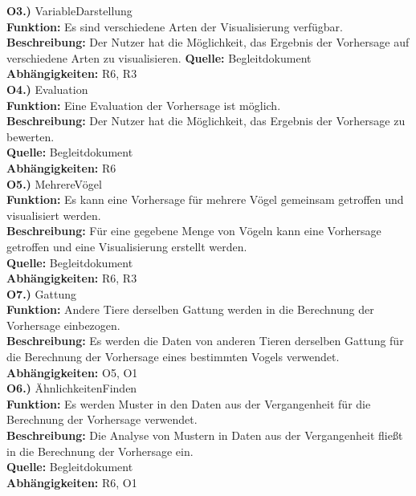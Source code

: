 \documentclass[12pt]{article} %
\begin{document}
\textbf{O3.)} VariableDarstellung \\
\textbf{Funktion:} Es sind verschiedene Arten der Visualisierung verfügbar.
\textbf{Beschreibung:} Der Nutzer hat die Möglichkeit, das Ergebnis der Vorhersage auf verschiedene Arten zu visualisieren.
\textbf{Quelle:} Begleitdokument \\
\textbf{Abhängigkeiten:} R6, R3 \\

\textbf{O4.)} Evaluation \\
\textbf{Funktion:} Eine Evaluation der Vorhersage ist möglich. \\
\textbf{Beschreibung:} Der Nutzer hat die Möglichkeit, das Ergebnis der Vorhersage zu bewerten. \\
\textbf{Quelle:} Begleitdokument \\
\textbf{Abhängigkeiten:} R6 \\

\textbf{O5.)} MehrereVögel \\
\textbf{Funktion:} Es kann eine Vorhersage für mehrere Vögel gemeinsam getroffen und visualisiert werden. \\
\textbf{Beschreibung:} Für eine gegebene Menge von Vögeln kann eine Vorhersage getroffen und eine Visualisierung erstellt werden. \\
\textbf{Quelle:} Begleitdokument \\
\textbf{Abhängigkeiten:} R6, R3 \\

\textbf{O7.)} Gattung \\
\textbf{Funktion:} Andere Tiere derselben Gattung werden in die Berechnung der Vorhersage einbezogen. \\
\textbf{Beschreibung:} Es werden die Daten von anderen Tieren derselben Gattung für die Berechnung der Vorhersage eines bestimmten Vogels verwendet. \\
\textbf{Abhängigkeiten:} O5, O1 \\

\textbf{O6.)} ÄhnlichkeitenFinden \\
\textbf{Funktion:} Es werden Muster in den Daten aus der Vergangenheit für die Berechnung der Vorhersage verwendet. \\
\textbf{Beschreibung:} Die Analyse von Mustern in Daten aus der Vergangenheit fließt in die Berechnung der Vorhersage ein. \\
\textbf{Quelle:} Begleitdokument \\
\textbf{Abhängigkeiten:} R6, O1 \\
\end{document}
